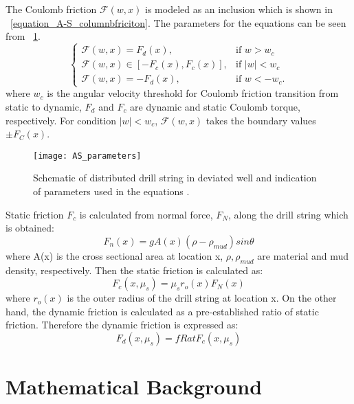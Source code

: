 The Coulomb friction $\mathcal{F}(w,x)$ is modeled as an inclusion which is shown in \equationname~\ref{equation_A-S_columnbfriciton}. The parameters for the equations can be seen from \figurename~\ref{figure_AS_equation_schematic}.
\begin{equation}\label{equation_A-S_columnbfriciton}
  \begin{cases}
     \mathcal{F}(w,x) = F_d(x), & \mbox{if } w>w_c \\
     \mathcal{F}(w,x) \in [-F_c(x), F_c(x)], & \mbox{if } |w|<w_c \ \\
     \mathcal{F}(w,x) = -F_d(x), & \mbox{if } w < -w_c.
  \end{cases}
\end{equation}
where $w_c$ is the angular velocity threshold for Coulomb friction transition from static to dynamic, $F_d$ and $F_c$ are dynamic and static Coulomb torque, respectively. For condition $|w|<w_c$, $\mathcal{F}(w,x)$ takes the boundary values $\pm F_C(x)$.
\begin{figure}
  \centering
  \texttt{[image: AS\_parameters]}
  \caption[Schematic of distributed drill string in deviated well]{Schematic of distributed drill string in deviated well and indication of parameters used in the equations \cite{ref:aarsnes2017a}.}\label{figure_AS_equation_schematic}
\end{figure}

Static friction $F_c$ is calculated from normal force, $F_N$, along the drill string which is obtained:
\begin{equation}\label{equation_AS_normal_force}
  F_n(x) = gA(x)(\rho-\rho_{mud})sin\theta
\end{equation}
where A(x) is the cross sectional area at location x,  $\rho, \rho_{mud}$ are material and mud density, respectively.
Then the static friction is calculated as:
\begin{equation}\label{equation_A-S_static_fric}
  F_c(x,\mu_s) = \mu_sr_o(x)F_N(x)
\end{equation}
where $r_o(x)$ is the outer radius of the drill string at location x. 
On the other hand, the dynamic friction is calculated as a pre-established ratio of static friction. Therefore the dynamic friction is expressed as:
\begin{equation}\label{equation_A-S_dynamic_fric}
  F_d(x,\mu_s) = fRat F_c(x,\mu_s)
\end{equation}

\section{Mathematical Background}\label{SubSec_AS_mathematicalbackground}
